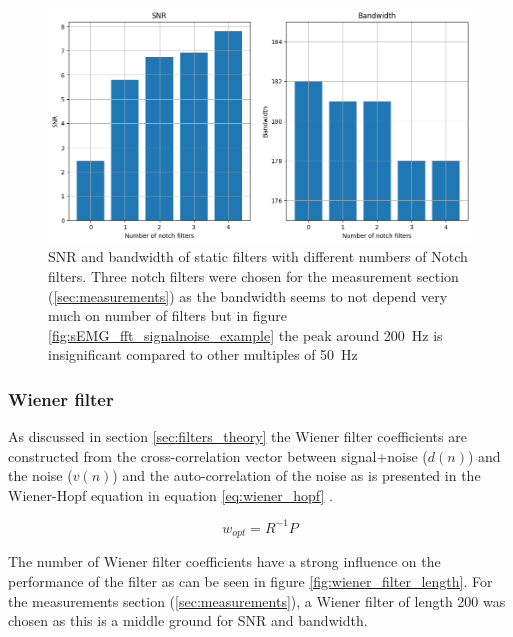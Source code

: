 \begin{figure}[h!t]
	\begin{center}
		\includegraphics[width=1.0\columnwidth]{images/staticfilter_notches_barchart.png}
	\end{center}
	\caption{SNR and bandwidth of static filters with different numbers of Notch filters. Three notch filters were chosen for the measurement section (\ref{sec:measurements}) as the bandwidth seems to not depend very much on number of filters but in figure \ref{fig:sEMG_fft_signalnoise_example} the peak around \SI{200}{\hertz} is insignificant compared to other multiples of \SI{50}{\hertz}}
	\label{fig:staticfilter_notches_barchart}
\end{figure}


\subsubsection{Wiener filter}
As discussed in section \ref{sec:filters_theory} the Wiener filter coefficients are constructed from the cross-correlation vector between signal+noise ($d(n)$) and the noise ($v(n)$) and the auto-correlation of the noise as is presented in the Wiener-Hopf equation in equation \ref{eq:wiener_hopf} \cite{lecture_adaptive_filters_1}. 

\begin{equation}
    w_{opt} = R^{-1}P
    \label{eq:wiener_hopf}
\end{equation}

The number of Wiener filter coefficients have a strong influence on the performance of the filter as can be seen in figure \ref{fig:wiener_filter_length}. For the measurements section (\ref{sec:measurements}), a Wiener filter of length 200 was chosen as this is a middle ground for SNR and bandwidth.

